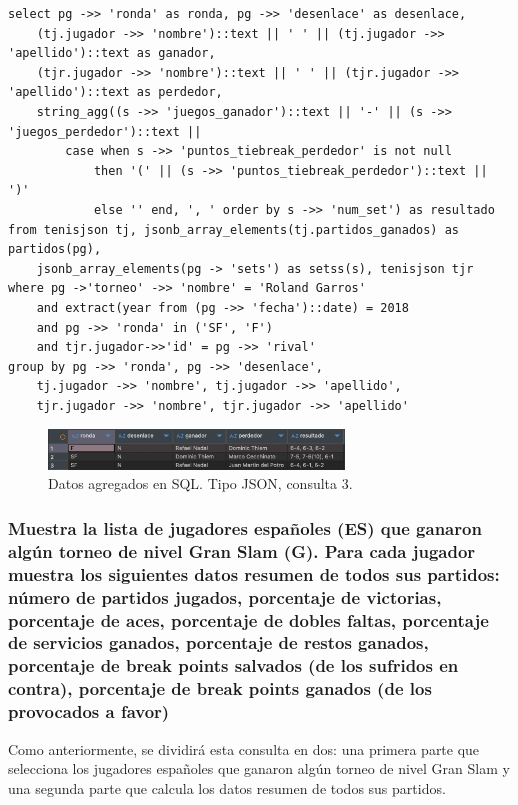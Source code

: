 \begin{verbatim}
select pg ->> 'ronda' as ronda, pg ->> 'desenlace' as desenlace, 
	(tj.jugador ->> 'nombre')::text || ' ' || (tj.jugador ->> 'apellido')::text as ganador, 
	(tjr.jugador ->> 'nombre')::text || ' ' || (tjr.jugador ->> 'apellido')::text as perdedor, 
	string_agg((s ->> 'juegos_ganador')::text || '-' || (s ->> 'juegos_perdedor')::text || 
		case when s ->> 'puntos_tiebreak_perdedor' is not null 
			then '(' || (s ->> 'puntos_tiebreak_perdedor')::text || ')' 
			else '' end, ', ' order by s ->> 'num_set') as resultado
from tenisjson tj, jsonb_array_elements(tj.partidos_ganados) as partidos(pg), 
	jsonb_array_elements(pg -> 'sets') as setss(s), tenisjson tjr
where pg ->'torneo' ->> 'nombre' = 'Roland Garros'
    and extract(year from (pg ->> 'fecha')::date) = 2018
    and pg ->> 'ronda' in ('SF', 'F')
    and tjr.jugador->>'id' = pg ->> 'rival'
group by pg ->> 'ronda', pg ->> 'desenlace', 
	tj.jugador ->> 'nombre', tj.jugador ->> 'apellido', 
	tjr.jugador ->> 'nombre', tjr.jugador ->> 'apellido'
\end{verbatim}

\begin{figure}[H]
\centering
\includegraphics[width=0.7\textwidth]{fotos/q3_json.png}
\caption{Datos agregados en SQL. Tipo JSON, consulta 3.}
\label{fig:q3_json}
\end{figure}



\subsubsection{Muestra la lista de jugadores españoles (ES) que ganaron algún torneo de nivel Gran Slam (G). Para cada jugador muestra los siguientes datos resumen de todos sus partidos: número de partidos jugados, porcentaje de victorias, porcentaje de aces, porcentaje de dobles faltas, porcentaje de servicios ganados, porcentaje de restos ganados, porcentaje de break points salvados (de los sufridos en contra), porcentaje de break points ganados (de los provocados a favor)}


Como anteriormente, se dividirá esta consulta en dos: una primera parte que selecciona los jugadores españoles que ganaron algún torneo de nivel Gran Slam y una segunda parte que calcula los datos resumen de todos sus partidos. \\

